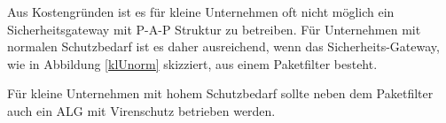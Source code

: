 Aus Kostengründen ist es für kleine Unternehmen oft nicht möglich ein Sicherheitsgateway mit P-A-P Struktur zu betreiben. Für Unternehmen mit normalen Schutzbedarf ist es daher ausreichend, wenn das Sicherheits-Gateway, wie in Abbildung \ref{klUnorm} skizziert, aus einem Paketfilter besteht. 

Für kleine Unternehmen mit hohem Schutzbedarf sollte neben dem Paketfilter auch ein ALG mit Virenschutz betrieben werden. 




